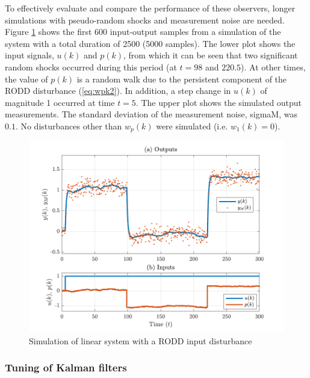 To effectively evaluate and compare the performance of these observers, longer simulations with pseudo-random shocks and measurement noise are needed. Figure \ref{fig:rod-obs-sim1-ioplot} shows the first 600 input-output samples from a simulation of the system with a total duration of 2500 (5000 samples). The lower plot shows the input signals, $u(k)$ and $p(k)$, from which it can be seen that two significant random shocks occurred during this period (at $t=98$ and $220.5$). At other times, the value of $p(k)$ is a random walk due to the persistent component of the \gls{RODD} disturbance (\ref{eq:wpk2}). In addition, a step change in $u(k)$ of magnitude 1 occurred at time $t=5$. The upper plot shows the simulated output measurements. The standard deviation of the measurement noise, \gls{sigmaM}, was $0.1$. No disturbances other than $w_p(k)$ were simulated (i.e. $w_1(k)=0$).
\begin{figure}[htp]
	\centering
	\includegraphics[width=13cm]{images/rod_obs_sim1_all_seed_ioplot.pdf}
	\caption{Simulation of linear system with a \gls{RODD} input disturbance}
	\label{fig:rod-obs-sim1-ioplot}
\end{figure}

\subsubsection{Tuning of Kalman filters} \label{sim-obs-lin-1-KF-tuning}

